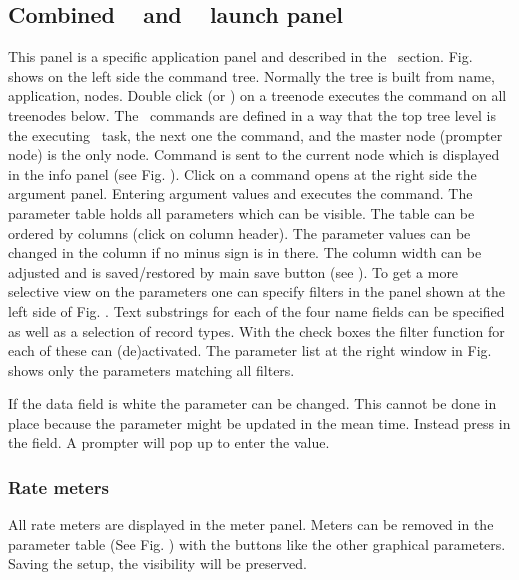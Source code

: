 {\subsection{Combined \dabc~ and \mbs~ launch panel}
This panel is a specific application panel and described in the \mbs\ section.
Fig.  shows
on the left side the command tree. Normally the tree is built
from name, application, nodes. Double click (or ) on a treenode
executes the command on all treenodes below. The \mbs\ commands
are defined in a way that the top tree level is the executing \mbs\ task,
the next one the command, and the master node (prompter node) is the only node.
Command is sent to the current node which is displayed in the info panel
(see Fig. ).
Click on a command opens at the right side the argument panel.
Entering argument values and  executes the command.
The parameter table holds all parameters which can be visible.
The table can be ordered by columns (click on column header). 
The parameter values can be changed
in the  column if no minus sign is in there.
The column width can be adjusted and is saved/restored by main save button
(see ).
To get a more selective view on the parameters one can specify
filters in the panel shown at the left side of Fig. . 
Text substrings for each of the four name fields
can be specified as well as a selection of record types.
With the check boxes the filter function for each of these can (de)activated.
The parameter list at the right window in Fig. 
shows only the parameters matching all filters.

If the data field is white the parameter can be changed.
This cannot be done in place because the parameter might be
updated in the mean time. Instead press  in the field.
A prompter will pop up to enter the value.
\subsubsection{Rate meters}
All rate meters are displayed in the meter panel. Meters can be removed
in the parameter table (See Fig. ) 
with the  buttons like the other graphical parameters.
Saving the setup, the visibility will be preserved.

}
